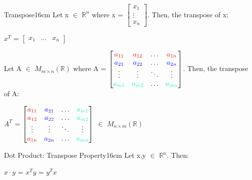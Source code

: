     \newpage



    \begin{definition}{Transpose}{16cm}
        Let x $\in$ $\mathbb{R}^n$
        where x =
        $\begin{bmatrix}
            x_1 \\
            \vdots \\
            x_n
        \end{bmatrix}$.
        Then, the {\color{lblue} transpose} of x:

        \hspace{0.5cm}
        $x^T$ =
        $\begin{bmatrix}
            x_1 & ... & x_n
        \end{bmatrix}$

        Let A $\in$ $M_{m \times n}(\mathbb{R})$
        where A =
        $\begin{bmatrix}
            \color{red} a_{11} & \color{red} a_{12} & \hdots & \color{red} a_{1n} \\
            \color{blue} a_{21} & \color{blue} a_{22}
                & \hdots & \color{blue} a_{2n} \\
            \vdots & \vdots & \ddots & \vdots \\
            \color{green} a_{m1} & \color{green} a_{m2}
                & \hdots & \color{green} a_{mn} 
        \end{bmatrix}$.
        Then, the transpose of A:

        \hspace{0.5cm}
        $A^T$ =
        $\begin{bmatrix}
            \color{red} a_{11} & \color{blue} a_{21}
                & \hdots & \color{green} a_{m1} \\
            \color{red} a_{12} & \color{blue} a_{22}
                & \hdots & \color{green} a_{m2} \\
            \vdots & \vdots & \ddots & \vdots \\
            \color{red} a_{1n} & \color{blue} a_{2n} 
                & \hdots & \color{green} a_{mn} 
        \end{bmatrix}$
        $\in$ $M_{n \times m}(\mathbb{R})$
    \end{definition}

    \vspace{0.5cm}



    \begin{wtheorem}{Dot Product: Transpose Property}{16cm}
        Let x,y $\in$ $\mathbb{R}^n$. Then:

        \hspace{0.5cm}
        $x \cdot y$ = $x^T y$ = $y^T x$
    \end{wtheorem}

